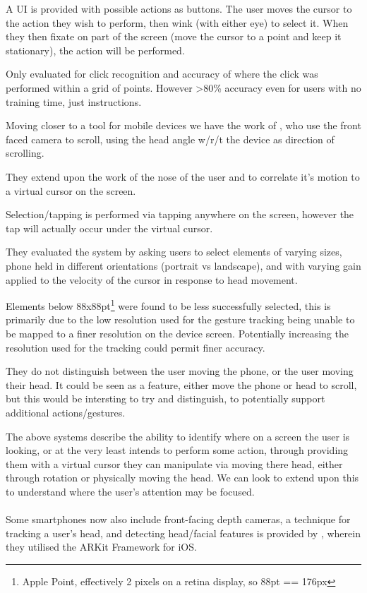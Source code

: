 A UI is provided with possible actions as buttons. The user moves the cursor to the action they wish to perform, then wink (with either eye) to select it. When they then fixate on part of the screen (move the cursor to a point and keep it stationary), the action will be performed.

Only evaluated for click recognition and accuracy of where the click was performed within a grid of points. However >80\% accuracy even for users with no training time, just instructions.

Moving closer to a tool for mobile devices we have the work of \citeauthor{roig2015face}, who use the front faced camera to scroll, using the head angle w/r/t the device as direction of scrolling.\cite{roig2015face}

They extend upon the work of \citeauthor{varona2008hands}\cite{varona2008hands} the nose of the user and to correlate it's motion to a virtual cursor on the screen.

Selection/tapping is performed via tapping anywhere on the screen, however the tap will actually occur under the virtual cursor.

They evaluated the system by asking users to select elements of varying sizes, phone held in different orientations (portrait vs landscape), and with varying gain applied to the velocity of the cursor in response to head movement.

Elements below 88x88pt\footnote{Apple Point, effectively 2 pixels on a retina display, so 88pt == 176px} were found to be less successfully selected, this is primarily due to the low resolution used for the gesture tracking being unable to be mapped to a finer resolution on the device screen. Potentially increasing the resolution used for the tracking could permit finer accuracy.

They do not distinguish between the user moving the phone, or the user moving their head. It could be seen as a feature, either move the phone or head to scroll, but this would be intersting to try and distinguish, to potentially support additional actions/gestures.

The above systems describe the ability to identify where on a screen the user is looking, or at the very least intends to perform some action, through providing them with a virtual cursor they can manipulate via moving there head, either through rotation or physically moving the head.
We can look to extend upon this to understand where the user's attention may be focused.
\\\\
Some smartphones now also include front-facing depth cameras, a technique for tracking a user's head, and detecting head/facial features is provided by \citeauthor{deepateep2020facial}, wherein they utilised the ARKit Framework for iOS\cite{deepateep2020facial}.

